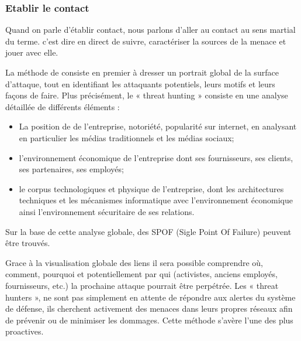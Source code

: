 \subsubsection{Etablir le contact}

Quand on parle d'établir contact, nous parlons d'aller au contact au sens martial du terme. c'est dire en direct de suivre, caractériser la sources de la menace et jouer avec elle.

La méthode de  consiste en premier à dresser un portrait global de la surface d’attaque, tout en identifiant les attaquants potentiels, leurs motifs et leurs façons de faire. Plus précisément, le « threat hunting » consiste en une analyse détaillée de différents éléments :

\begin{itemize}
	\item La position de de l’entreprise,  notoriété, popularité sur internet, en analysant en particulier  les médias traditionnels et les médias sociaux;
	\item l'environnement économique de l’entreprise dont ses fournisseurs, ses clients, ses partenaires, ses employés;
	\item le corpus technologiques et physique de l'entreprise, dont les architectures techniques et les mécanismes informatique avec l'environnement économique ainsi l'environnement sécuritaire de ses relations.
\end{itemize}

Sur la base de cette analyse globale, des SPOF (Sigle Point Of Failure) peuvent être trouvés. 

Grace à la visualisation  globale des liens il sera possible comprendre où, comment, pourquoi et potentiellement par qui (activistes, anciens employés, fournisseurs, etc.) la prochaine attaque pourrait être perpétrée. 
Les « threat hunters », ne sont pas simplement en attente de répondre aux alertes du système de défense, ils cherchent activement des menaces dans leurs propres réseaux afin de prévenir ou de minimiser les dommages. Cette méthode s’avère l’une des plus proactives. 


